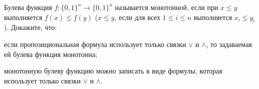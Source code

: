 Булева функция $f: \{0, 1\}^n \to \{0, 1\}^n$ называется монотонной, если при $x \le y$ выполняется $f(x) \le f(y)$ ($x \le
y$, если для всех $1 \le i \le n$ выполняется $x_i \le y_i$). Докажите, что:
\begin{enumcyr}
    \item если пропозициональная формула использует только связки $\lor$ и $\land$, то задаваемая ей булева функция
	    монотонна;
    \item монотонную булеву функцию можно записать в виде формулы, которая использует только связки $\lor$ и $\land$.
\end{enumcyr}
